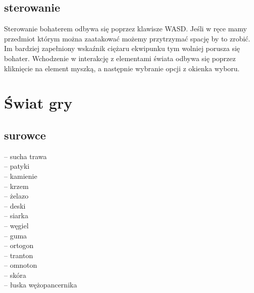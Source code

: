 \documentclass[22pt]{article}
\begin{document}
\subsection{sterowanie}
Sterowanie bohaterem odbywa się poprzez klawisze WASD. Jeśli w ręce mamy przedmiot którym można zaatakować możemy przytrzymać spację by to zrobić. Im bardziej zapełniony wskaźnik ciężaru ekwipunku tym wolniej porusza się bohater. Wchodzenie w interakcję z elementami świata odbywa się poprzez kliknięcie na element myszką, a następnie wybranie opcji z okienka wyboru.

\section{Świat gry}
\subsection{surowce}
-- sucha trawa\\
-- patyki\\
-- kamienie\\
-- krzem\\
-- żelazo\\
-- deski\\
-- siarka\\
-- węgiel\\
-- guma\\
-- ortogon\\
-- tranton\\
-- omnoton\\
-- skóra\\
-- łuska wężopancernika\\
\end{document}
